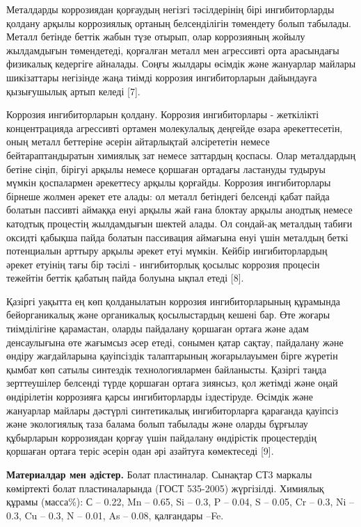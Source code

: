 \begin{multicols}{2}
Металдарды коррозиядан қорғаудың негізгі тәсілдерінің бірі
ингибиторларды қолдану арқылы коррозиялық ортаның белсенділігін
төмендету болып табылады. Металл бетінде беттік жабын түзе отырып, олар
коррозияның жойылу жылдамдығын төмендетеді, қорғалған металл мен
агрессивті орта арасындағы физикалық кедергіге айналады. Соңғы жылдары
өсімдік және жануарлар майлары шикізаттары негізінде жаңа тиімді
коррозия ингибиторларын дайындауға қызығушылық артып келеді {[}7{]}.

Коррозия ингибиторларын қолдану. Коррозия ингибиторлары - жеткілікті
концентрацияда агрессивті ортамен молекулалық деңгейде өзара
әрекеттесетін, оның металл беттеріне әсерін айтарлықтай әлсірететін
немесе бейтараптандыратын химиялық зат немесе заттардың қоспасы. Олар
металдардың бетіне сіңіп, бірігуі арқылы немесе қоршаған ортадағы
ластануды тудыруы мүмкін қоспалармен әрекеттесу арқылы қорғайды.
Коррозия ингибиторлары бірнеше жолмен әрекет ете алады: ол металл
бетіндегі белсенді қабат пайда болатын пассивті аймаққа енуі арқылы жай
ғана блоктау арқылы анодтық немесе катодтық процестің жылдамдығын шектей
алады. Ол сондай-ақ металдың табиғи оксидті қабықша пайда болатын
пассивация аймағына енуі үшін металдың беткі потенциалын арттыру арқылы
әрекет етуі мүмкін. Кейбір ингибиторлардың әрекет етуінің тағы бір
тәсілі - ингибиторлық қосылыс коррозия процесін тежейтін беттік қабатың
пайда болуына ықпал етеді {[}8{]}.

Қазіргі уақытта ең көп қолданылатын коррозия ингибиторларының құрамында
бейорганикалық және органикалық қосылыстардың кешені бар. Өте жоғары
тиімділігіне қарамастан, оларды пайдалану қоршаған ортаға және адам
денсаулығына өте жағымсыз әсер етеді, сонымен қатар сақтау, пайдалану
және өндіру жағдайларына қауіпсіздік талаптарының жоғарылауымен бірге
жүретін қымбат көп сатылы синтездік технологиялармен байланысты. Қазіргі
таңда зерттеушілер белсенді түрде қоршаған ортаға зиянсыз, қол жетімді
және оңай өндірілетін коррозияға қарсы ингибиторларды іздестіруде.
Өсімдік және жануарлар майлары дәстүрлі синтетикалық ингибиторларға
қарағанда қауіпсіз және экологиялық таза балама болып табылады және
оларды бұрғылау құбырларын коррозиядан қорғау үшін пайдалану өндірістік
процестердің қоршаған ортаға теріс әсерін одан әрі азайтуға көмектеседі
{[}9{]}.


{\bfseries Материалдар мен әдістер.} Болат пластиналар. Сынақтар СТ3
маркалы көміртекті болат пластиналарында (ГОСТ 535-2005) жүргізілді.
Химиялық құрамы (масса\%): С -- 0.22, Mn -- 0.65, Si -- 0.3, P -- 0.04,
S -- 0.05, Cr -- 0.3, Ni -- 0.3, Cu -- 0.3, N -- 0.01, As -- 0.08,
қалғандары --Fe.


\end{multicols}
